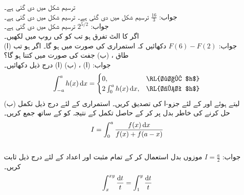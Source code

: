 ترسیم شکل  میں دی گئی ہے۔\\
جواب:\quad
$\tfrac{16}{3}$
ترسیم شکل  میں دی گئی ہے۔
ترسیم شکل  میں دی گئی ہے۔\\
جواب:\quad
$2^{5/2}$
ترسیم شکل  میں دی گئی ہے۔
\\
اگر  کا الٹ تفرق  ہو تب  کو  کی روپ میں لکھیں۔\\
جواب:\quad
$F(6)-F(2)$
دکھائیں کہ استمراری  کی صورت میں  ہو گا۔
اگر  ہو تب (ا) طاق ، (ب) جفت  کی صورت میں  کتنا ہو گا؟\\
جواب:\quad
(ا) ، (ب) 
(ا) درج ذیل دکھائیں۔
\begin{align*}
\int_{-a}^ah(x)\dif x=
\begin{cases}
0,& \text{\RL{طاق $h$}}\\
2\int_0^ah(x)\dif x,&\text{\RL{جفت $h$}}
\end{cases}
\end{align*}
(ب)  لیتے ہوئے  اور  کے لئے جزو-ا کی تصدیق کریں۔ 
استمراری  کے لئے  درج ذیل تکمل حل کرنے کی خاطر  بدل  پر کر کے حاصل تکمل کے نتیجہ کو  کے ساتھ جمع کریں۔
\begin{align*}
I=\int_0^a\frac{f(x)\dif x}{f(x)+f(a-x)}
\end{align*}\\
جواب:\quad
$I=\tfrac{a}{2}$
موزوں بدل استعمال کر کے تمام مثبت  اور  اعداد کے لئے درج ذیل ثابت کریں۔
\begin{align*}
\int_x^{xy}\frac{\dif t}{t}=\int_1^y\frac{\dif t}{t}
\end{align*} 
